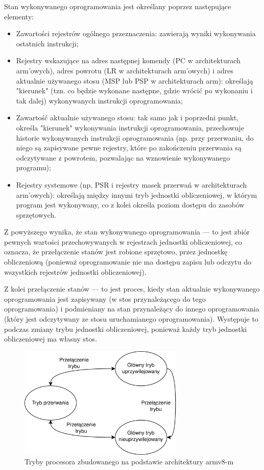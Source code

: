 \documentclass[../main]{subfiles}
\begin{document}
Stan wykonywanego oprogramowania jest określany poprzez następujące elementy:

\begin{itemize}
    \item Zawartości rejestrów ogólnego przeznaczenia: zawierają wyniki wykonywania ostatnich
    instrukcji;
    \item Rejestry wskazujące na adres następnej komendy (PC w architekturach \acrshort{arm}'owych),
    adres powrotu (LR w architekturach \acrshort{arm}'owych) i adres aktualnie używanego stosu (MSP
    lub PSP w architekturach \acrshort{arm}): określają "kierunek" (tzn. co będzie wykonane następne,
    gdzie wrócić po wykonaniu i tak dalej) wykonywanych instrukcji oprogramowania;
    \item Zawartość aktualnie używanego stosu: tak samo jak i poprzedni punkt, określa "kierunek"
    wykonywania instrukcji oprogramowania, przechowuje historie wykonywanych instrukcji oprogramowania
    (np. przy przerwaniu, do niego są zapisywane pewne rejestry, które po zakończeniu przerwania są
    odczytywane z powrotem, pozwalając na wznowienie wykonywanego programu);
    \item Rejestry systemowe (np. PSR i rejestry masek przerwań w architekturach \acrshort{arm}'owych):
    określają między innymi tryb jednostki obliczeniowej, w którym program jest wykonywany, co z kolei
    określa poziom dostępu do zasobów sprzętowych.
\end{itemize}

Z powyższego wynika, że stan wykonywanego oprogramowania — to jest zbiór pewnych wartości
przechowywanych w rejestrach jednostki obliczeniowej, co oznacza, że przełączenie stanów jest robione
sprzętowo, przez jednostkę obliczeniową (ponieważ oprogramowanie nie ma dostępu zapisu lub odczytu do
wszystkich rejestrów jednostki obliczeniowej).

Z kolei przełączenie stanów — to jest proces, kiedy stan aktualnie wykonywanego oprogramowania jest
zapisywany (w stos przynależącego do tego oprogramowania) i podmieniany na stan przynależący do innego
oprogramowania (który jest odczytywany ze stosu uruchamianego oprogramowania). Występuje to podczas
zmiany trybu jednostki obliczeniowej, ponieważ każdy tryb jednostki obliczeniowej ma własny stos.

\begin{figure}[h]
    \centering
    \includegraphics[width=0.7\textwidth]{Images/armv8m-modes.png}
    \caption{Tryby procesora zbudowanego na podstawie architektury \acrshort{arm}v8-\acrshort{m}
    \cite{armv8mintro}}
    \label{fig:armv8-m-modes}
\end{figure}
\end{document}
